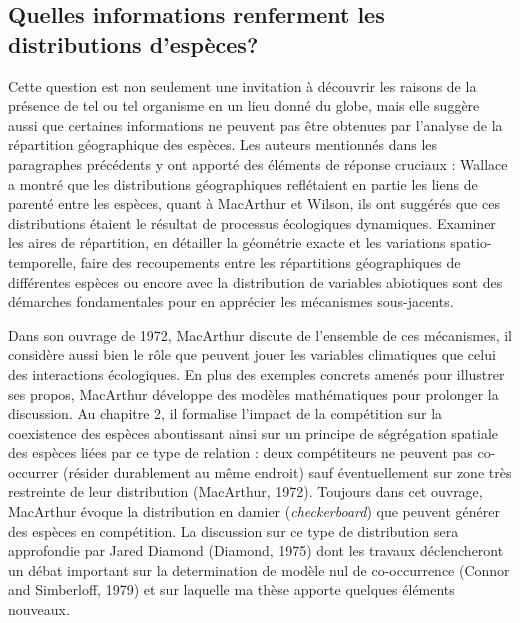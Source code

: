 \subsection*{Quelles informations renferment les distributions
d'espèces?}\label{quelles-informations-renferment-les-distributions-despuxe8ces}

Cette question est non seulement une invitation à découvrir les raisons
de la présence de tel ou tel organisme en un lieu donné du globe, mais
elle suggère aussi que certaines informations ne peuvent pas être
obtenues par l'analyse de la répartition géographique des espèces. Les
auteurs mentionnés dans les paragraphes précédents y ont apporté des
éléments de réponse cruciaux : Wallace a montré que les distributions
géographiques reflétaient en partie les liens de parenté entre les
espèces, quant à MacArthur et Wilson, ils ont suggérés que ces
distributions étaient le résultat de processus écologiques dynamiques.
Examiner les aires de répartition, en détailler la géométrie exacte et
les variations spatio-temporelle, faire des recoupements entre les
répartitions géographiques de différentes espèces ou encore avec la
distribution de variables abiotiques sont des démarches fondamentales
pour en apprécier les mécanismes sous-jacents.

Dans son ouvrage de 1972, MacArthur discute de l'ensemble de ces
mécanismes, il considère aussi bien le rôle que peuvent jouer les
variables climatiques que celui des interactions écologiques. En plus
des exemples concrets amenés pour illustrer ses propos, MacArthur
développe des modèles mathématiques pour prolonger la discussion. Au
chapitre 2, il formalise l'impact de la compétition sur la coexistence
des espèces aboutissant ainsi sur un principe de ségrégation spatiale
des espèces liées par ce type de relation : deux compétiteurs ne peuvent
pas co-occurrer (résider durablement au même endroit) sauf
éventuellement sur zone très restreinte de leur distribution (MacArthur,
1972). Toujours dans cet ouvrage, MacArthur évoque la distribution en
damier (\emph{checkerboard}) que peuvent générer des espèces en
compétition. La discussion sur ce type de distribution sera approfondie
par Jared Diamond (Diamond, 1975) dont les travaux déclencheront un
débat important sur la determination de modèle nul de co-occurrence
(Connor and Simberloff, 1979) et sur laquelle ma thèse apporte quelques
éléments nouveaux.

